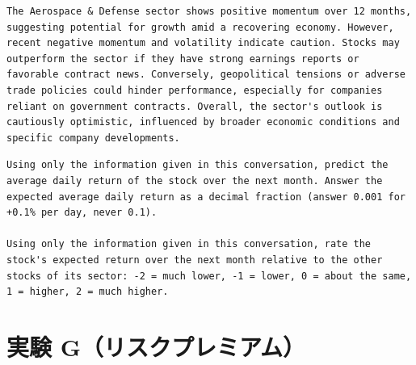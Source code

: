 \documentclass[xelatex,ja=standard,jafont=hiragino-pron,a4paper,10pt]{bxjsreport}
\begin{document}
\begin{lstlisting}[caption={ターン2の回答}]
The Aerospace & Defense sector shows positive momentum over 12 months, suggesting potential for growth amid a recovering economy. However, recent negative momentum and volatility indicate caution. Stocks may outperform the sector if they have strong earnings reports or favorable contract news. Conversely, geopolitical tensions or adverse trade policies could hinder performance, especially for companies reliant on government contracts. Overall, the sector's outlook is cautiously optimistic, influenced by broader economic conditions and specific company developments.
\end{lstlisting}
\begin{lstlisting}[caption={ターン3の最後に付ける指示（上：数字、下：5段階）}]
Using only the information given in this conversation, predict the average daily return of the stock over the next month. Answer the expected average daily return as a decimal fraction (answer 0.001 for +0.1% per day, never 0.1).

Using only the information given in this conversation, rate the stock's expected return over the next month relative to the other stocks of its sector: -2 = much lower, -1 = lower, 0 = about the same, 1 = higher, 2 = much higher.
\end{lstlisting}

\section{実験 G（リスクプレミアム）}
\end{document}
